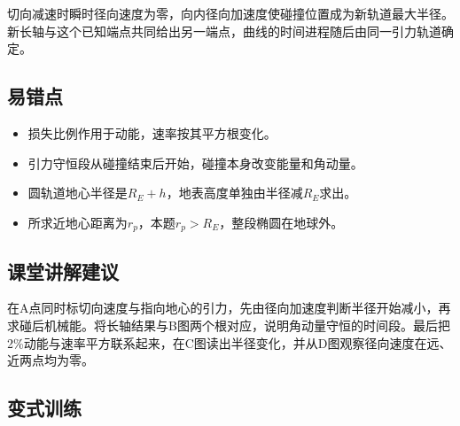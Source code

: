 \documentclass[UTF8,fontset=fandol,a4paper,11pt]{ctexart}
\begin{document}
切向减速时瞬时径向速度为零，向内径向加速度使碰撞位置成为新轨道最大半径。新长轴与这个已知端点共同给出另一端点，曲线的时间进程随后由同一引力轨道确定。



\subsection*{易错点}

\begin{itemize}
\item 损失比例作用于动能，速率按其平方根变化。
\item 引力守恒段从碰撞结束后开始，碰撞本身改变能量和角动量。
\item 圆轨道地心半径是$R_E+h$，地表高度单独由半径减$R_E$求出。
\item 所求近地心距离为$r_p$，本题$r_p>R_E$，整段椭圆在地球外。\end{itemize}



\subsection*{课堂讲解建议}

在A点同时标切向速度与指向地心的引力，先由径向加速度判断半径开始减小，再求碰后机械能。将长轴结果与B图两个根对应，说明角动量守恒的时间段。最后把2\%动能与速率平方联系起来，在C图读出半径变化，并从D图观察径向速度在远、近两点均为零。



\subsection*{变式训练}
\end{document}
